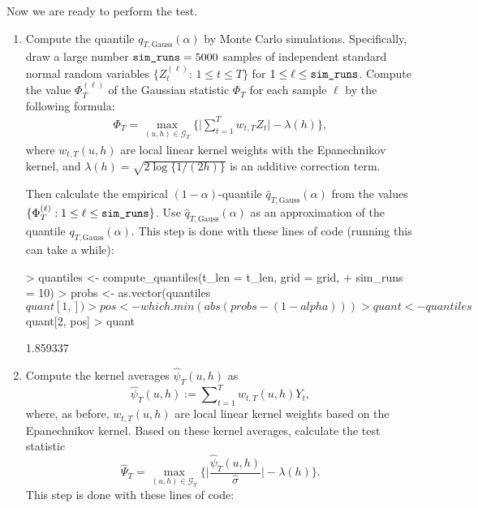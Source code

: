 \documentclass[a4paper]{scrartcl}
\begin{document}
Now we are ready to perform the test.
\begin{enumerate}[label=\textit{Step \arabic*.}, leftmargin=1.45cm]
  \item Compute the quantile $q_{T,\text{Gauss}}(\alpha)$ by Monte Carlo simulations. Specifically, draw a large number $\verb|sim_runs| = 5000$ samples of independent standard normal random variables $\{Z_{t}^{(\ell)} : \, 1 \le t \le T \}$ for $1 \le \ell \le \verb|sim_runs|$. Compute the value $\Phi_T^{(\ell)}$ of the Gaussian statistic $\Phi_T$ for each sample $\ell$ by the following formula:
\begin{align*}
\Phi_T = \max_{(u, h) \in \mathcal{G}_T}\bigg\{ \Big|\sum\limits_{t=1}^T w_{t, T} Z_{t}\Big| - \lambda(h) \bigg\},
\end{align*}
where $w_{t, T}(u, h)$ are local linear kernel weights with the Epanechnikov kernel, and $\lambda(h) = \sqrt{2 \log \{ 1/(2h) \}}$ is an additive correction term.

Then calculate the empirical $(1-\alpha)$-quantile $\widehat{q}_{T,\text{Gauss}}(\alpha)$ from the values $\{ \Phi_T^{(\ell)}: 1 \le \ell \le \verb|sim_runs| \}$. Use $\widehat{q}_{T,\text{Gauss}}(\alpha)$ as an approximation of the quantile $q_{T,\text{Gauss}}(\alpha)$.
This step is done with these lines of code (running this can take a while):

\begin{Schunk}
\begin{Sinput}
> quantiles <- compute_quantiles(t_len = t_len, grid = grid,
+                                sim_runs = 10)
> probs <- as.vector(quantiles$quant[1, ])
> pos   <- which.min(abs(probs - (1 - alpha)))
> quant <- quantiles$quant[2, pos]
> quant
\end{Sinput}
\begin{Soutput}
[1] 1.859337
\end{Soutput}
\end{Schunk}
  \item Compute the kernel averages $\widehat{\psi}_{T}(u, h)$ as
  \begin{equation*}
 \widehat{\psi}_{T}(u, h) := \sum\nolimits_{t=1}^T w_{t, T}(u, h) Y_{t},
\end{equation*}
where, as before, $w_{t, T}(u, h)$ are local linear kernel weights based on the Epanechnikov kernel. Based on these kernel averages, calculate the test statistic
$$\widehat{\Psi}_{T} = \max_{(u, h)\in \mathcal{G}_T} \bigg\{ \Big| \frac{\widehat{\psi}_{T}(u, h) }{\widehat{\sigma}}\Big| - \lambda(h) \Bigg\}.$$
This step is done with these lines of code:


\end{enumerate}
\end{document}
